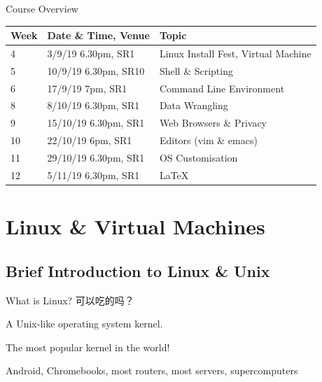 \documentclass[11pt]{beamer}
\begin{document}
\begin{frame}{Course Overview}
  \begin{center}
    \begin{tabularx}{\textwidth}{l|l|X}
      \textbf{Week} & \textbf{Date \& Time, Venue} & \textbf{Topic}                      \\ \hline
      4             & 3/9/19 6.30pm, SR1           & Linux Install Fest, Virtual Machine \\ \hline
      5             & 10/9/19 6.30pm, SR10         & Shell \& Scripting                  \\ \hline
      6             & 17/9/19 7pm, SR1             & Command Line Environment            \\ \hline
      8             & 8/10/19 6.30pm, SR1          & Data Wrangling                      \\ \hline
      9             & 15/10/19 6.30pm, SR1         & Web Browsers \& Privacy             \\ \hline
      10            & 22/10/19 6pm, SR1            & Editors (vim \& emacs)              \\ \hline
      11            & 29/10/19 6.30pm, SR1         & OS Customisation                    \\ \hline
      12            & 5/11/19 6.30pm, SR1          & \LaTeX                              \\ \hline
    \end{tabularx}
  \end{center}
\end{frame}

\section{Linux \& Virtual Machines}
\subsection{Brief Introduction to Linux \& Unix}

\begin{frame}{What is Linux?}
  可以吃的吗？\pause

  A Unix-like operating system kernel.

  The most popular kernel in the world!

  Android, Chromebooks, most routers, most servers, supercomputers
\end{frame}
\end{document}
